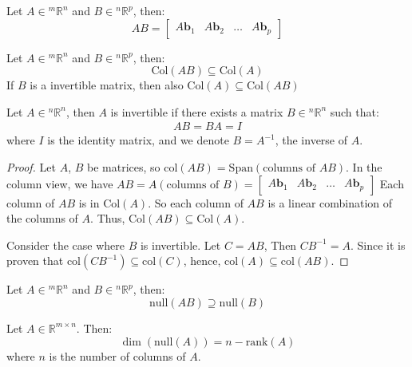 \documentclass[11pt]{report}
\begin{document}
\begin{definition}
    Let $A \in {^m\mathbb{R}^n}$ and $B \in {^n\mathbb{R}^p}$, then:
    \begin{equation}
        AB = \begin{bmatrix} A\textbf{b}_1 & A\textbf{b}_2 & \ldots & A\textbf{b}_p \end{bmatrix}
    \end{equation}
\end{definition}
\begin{theorem}
    Let $A \in {^m\mathbb{R}^n}$ and $B \in {^n\mathbb{R}^p}$, then:
    \begin{equation}
        \text{Col}(AB) \subseteq \text{Col}(A)
    \end{equation}
    If $B$ is a invertible matrix, then also $\text{Col}(A) \subseteq \text{Col}(AB)$
\end{theorem}
\begin{definition}[Invertible]
    Let $A \in {^n\mathbb{R}^n}$, then $A$ is invertible if there exists a matrix $B \in {^n\mathbb{R}^n}$ such that:
    \begin{align}
        AB = BA = I
    \end{align}
    where $I$ is the identity matrix, and we denote $B = A^{-1}$, the inverse of $A$.
\end{definition}
\begin{proof}
    Let $A$, $B$ be matrices, so $\text{col}(AB) = \text{Span}(\text{columns of }AB)$. In the column view, we have $AB = A(\text{columns of }B) = \begin{bmatrix}
        A\textbf{b}_1 & A\textbf{b}_2 & \ldots & A\textbf{b}_p
    \end{bmatrix}$
    Each column of $AB$ is in $\text{Col}(A)$. So each column of $AB$ is a linear combination of the columns of $A$. Thus, $\text{Col}(AB) \subseteq \text{Col}(A)$.

    Consider the case where $B$ is invertible. Let $C = AB$, Then $CB^{-1} = A$. Since it is proven that $\text{col}(CB^{-1}) \subseteq \text{col}(C)$, hence,  $\text{col}(A) \subseteq \text{col}(AB)$.
\end{proof}
\begin{definition}
    Let $A \in {^m\mathbb{R}^n}$ and $B \in {^n\mathbb{R}^p}$, then:
    \begin{equation}
        \text{null}(AB) \supseteq \text{null}(B)
    \end{equation}
\end{definition}
\begin{definition}
    Let $A \in \mathbb{R}^{m \times n}$. Then:
    \begin{equation}
        \dim(\text{null}(A)) = n - \text{rank}(A)
    \end{equation}
    where $n$ is the number of columns of $A$.
\end{definition}
\end{document}
